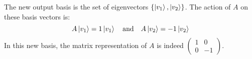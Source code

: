 \documentclass{article}
\begin{document}
The new output basis is the set of eigenvectors $\{\ket{v_1}, \ket{v_2}\}$. The action of $A$ on these basis vectors is:
$$ A\ket{v_1} = 1\ket{v_1} \quad \text{and} \quad A\ket{v_2} = -1\ket{v_2} $$
In this new basis, the matrix representation of $A$ is indeed $\begin{pmatrix} 1 & 0 \\ 0 & -1 \end{pmatrix}$.
\end{document}
